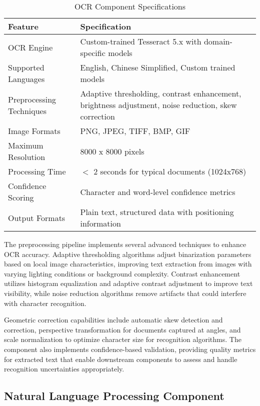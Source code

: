 \begin{table}[H]
\centering
\caption{OCR Component Specifications}
\label{tab:ocr_specifications}
\begin{tabular}{|l|p{8cm}|}
\hline
\textbf{Feature} & \textbf{Specification} \\
\hline
OCR Engine & Custom-trained Tesseract 5.x with domain-specific models \\
\hline
Supported Languages & English, Chinese Simplified, Custom trained models \\
\hline
Preprocessing Techniques & Adaptive thresholding, contrast enhancement, brightness adjustment, noise reduction, skew correction \\
\hline
Image Formats & PNG, JPEG, TIFF, BMP, GIF \\
\hline
Maximum Resolution & 8000 x 8000 pixels \\
\hline
Processing Time & $<$ 2 seconds for typical documents (1024x768) \\
\hline
Confidence Scoring & Character and word-level confidence metrics \\
\hline
Output Formats & Plain text, structured data with positioning information \\
\hline
\end{tabular}
\end{table}

The preprocessing pipeline implements several advanced techniques to enhance OCR accuracy. Adaptive thresholding algorithms adjust binarization parameters based on local image characteristics, improving text extraction from images with varying lighting conditions or background complexity. Contrast enhancement utilizes histogram equalization and adaptive contrast adjustment to improve text visibility, while noise reduction algorithms remove artifacts that could interfere with character recognition.

Geometric correction capabilities include automatic skew detection and correction, perspective transformation for documents captured at angles, and scale normalization to optimize character size for recognition algorithms. The component also implements confidence-based validation, providing quality metrics for extracted text that enable downstream components to assess and handle recognition uncertainties appropriately.

\subsection{Natural Language Processing Component}

